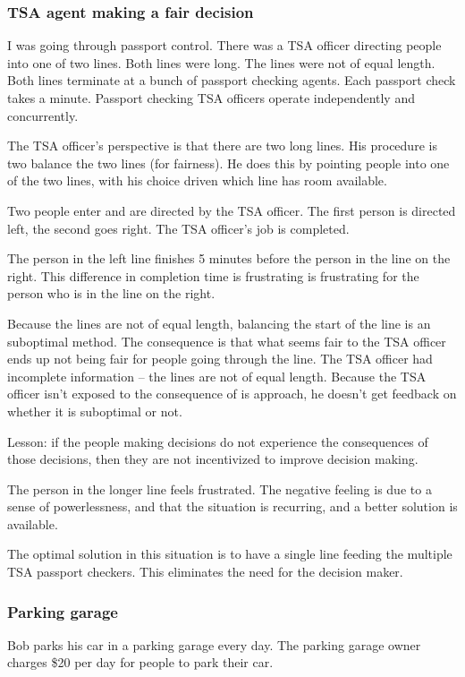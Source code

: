 \subsubsection{TSA agent making a fair decision}
I was going through passport control. There was a TSA officer directing people into one of two lines. Both lines were long. The lines were not of equal length. Both lines terminate at a bunch of passport checking agents. Each passport check takes a minute. Passport checking TSA officers operate independently and concurrently.


The TSA officer's perspective is that there are two long lines. His procedure is two balance the two lines (for fairness). He does this by pointing people into one of the two lines, with his choice driven which line has room available.

Two people enter and are directed by the TSA officer. The first person is directed left, the second goes right. The TSA officer's job is completed.

The person in the left line finishes 5 minutes before the person in the line on the right. This difference in completion time is frustrating is frustrating for the person who is in the line on the right.

Because the lines are not of equal length, balancing the start of the line is an suboptimal method. The consequence is that what seems fair to the TSA officer ends up not being fair for people going through the line. The TSA officer had incomplete information -- the lines are not of equal length. Because the TSA officer isn't exposed to the consequence of is approach, he doesn't get feedback on whether it is suboptimal or not.

Lesson: if the people making decisions do not experience the consequences of those decisions, then they are not incentivized to improve decision making.

The person in the longer line feels frustrated. The negative feeling is due to a sense of powerlessness, and that the situation is recurring, and a better solution is available.

The optimal solution in this situation is to have a single line feeding the multiple TSA passport checkers. This eliminates the need for the decision maker.


\subsubsection{Parking garage}
Bob parks his car in a parking garage every day. The parking garage owner charges \$20 per day for people to park their car.

